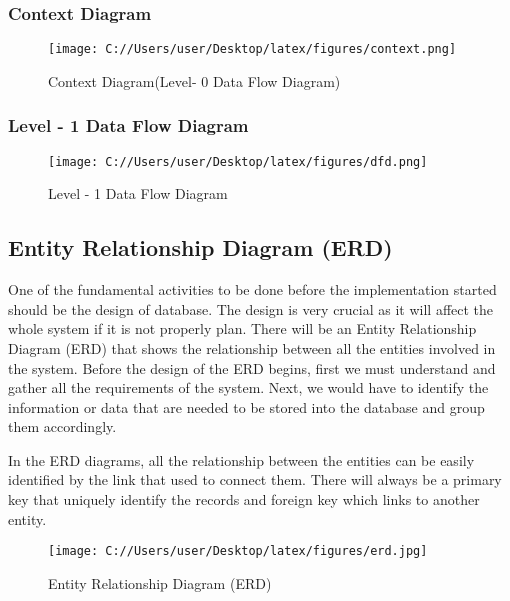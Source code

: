 \documentclass{article}
\begin{document}
\subsubsection{Context Diagram}
 \begin{figure}[h!]
  \texttt{[image: C://Users/user/Desktop/latex/figures/context.png]}
  \caption{Context Diagram(Level- 0 Data Flow Diagram)}
  \label{fig:context}
\end{figure}
\newpage
\subsubsection{Level - 1 Data Flow Diagram}
 \begin{figure}[h!]
  \texttt{[image: C://Users/user/Desktop/latex/figures/dfd.png]}
  \caption{Level - 1 Data Flow Diagram}
  \label{fig:dfd}
\end{figure}
\newpage
\subsection{Entity Relationship Diagram (ERD)}
\par One of the fundamental activities to be done before the implementation started should be the design of
database. The design is very crucial as it will affect the whole system if it is not properly plan. There will be an Entity Relationship Diagram (ERD) that shows the relationship between all the entities involved in the system. Before the design of the ERD begins, first we must understand and gather all the requirements of the system. Next, we would have to identify the information or data that are needed to be stored into the database and group them accordingly.
\par In the ERD diagrams, all the relationship between the entities can be easily identified by the link that used to connect them. There will always be a primary key that uniquely identify the records and foreign key which links to another entity.
 \begin{figure}[h!]
  \texttt{[image: C://Users/user/Desktop/latex/figures/erd.jpg]}
  \caption{Entity Relationship Diagram (ERD)}
  \label{fig:erd}
\end{figure}
\end{document}
